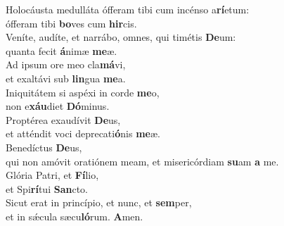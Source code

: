 \evenverse Holocáusta medulláta ófferam tibi cum incénso a\textbf{rí}etum:~\*\\
\evenverse ófferam tibi \textbf{bo}ves cum \textbf{hir}cis.\\
\oddverse Veníte, audíte, et narrábo, omnes, qui timétis \textbf{De}um:~\*\\
\oddverse quanta fecit \textbf{á}nimæ \textbf{me}æ.\\
\evenverse Ad ipsum ore meo cla\textbf{má}vi,~\*\\
\evenverse et exaltávi sub \textbf{lin}gua \textbf{me}a.\\
\oddverse Iniquitátem si aspéxi in corde \textbf{me}o,~\*\\
\oddverse non e\textbf{xáu}diet \textbf{Dó}minus.\\
\evenverse Proptérea exaudívit \textbf{De}us,~\*\\
\evenverse et atténdit voci deprecati\textbf{ó}nis \textbf{me}æ.\\
\oddverse Benedíctus \textbf{De}us,~\*\\
\oddverse qui non amóvit oratiónem meam, et misericórdiam \textbf{su}am \textbf{a} me.\\
\evenverse Glória Patri, et \textbf{Fí}lio,~\*\\
\evenverse et Spi\textbf{rí}tui \textbf{San}cto.\\
\oddverse Sicut erat in princípio, et nunc, et \textbf{sem}per,~\*\\
\oddverse et in sǽcula sæcu\textbf{ló}rum. \textbf{A}men.\\
